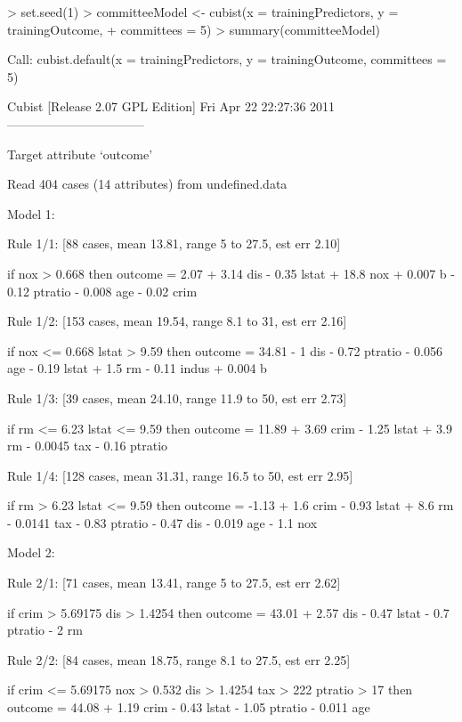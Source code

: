 \documentclass[12pt]{article}
\renewenvironment{Schunk}{\vspace{\topsep}}{\vspace{\topsep}}
\begin{document}
\begin{Schunk}
\begin{Sinput}
> set.seed(1)
> committeeModel <- cubist(x = trainingPredictors, y = trainingOutcome,
+                          committees = 5)
> summary(committeeModel)
\end{Sinput}
\begin{Soutput}
Call:
cubist.default(x = trainingPredictors, y = trainingOutcome, committees = 5)


Cubist [Release 2.07 GPL Edition]  Fri Apr 22 22:27:36 2011
---------------------------------

    Target attribute `outcome'

Read 404 cases (14 attributes) from undefined.data

Model 1:

  Rule 1/1: [88 cases, mean 13.81, range 5 to 27.5, est err 2.10]

    if
	nox > 0.668
    then
	outcome = 2.07 + 3.14 dis - 0.35 lstat + 18.8 nox + 0.007 b
	          - 0.12 ptratio - 0.008 age - 0.02 crim

  Rule 1/2: [153 cases, mean 19.54, range 8.1 to 31, est err 2.16]

    if
	nox <= 0.668
	lstat > 9.59
    then
	outcome = 34.81 - 1 dis - 0.72 ptratio - 0.056 age - 0.19 lstat + 1.5 rm
	          - 0.11 indus + 0.004 b

  Rule 1/3: [39 cases, mean 24.10, range 11.9 to 50, est err 2.73]

    if
	rm <= 6.23
	lstat <= 9.59
    then
	outcome = 11.89 + 3.69 crim - 1.25 lstat + 3.9 rm - 0.0045 tax
	          - 0.16 ptratio

  Rule 1/4: [128 cases, mean 31.31, range 16.5 to 50, est err 2.95]

    if
	rm > 6.23
	lstat <= 9.59
    then
	outcome = -1.13 + 1.6 crim - 0.93 lstat + 8.6 rm - 0.0141 tax
	          - 0.83 ptratio - 0.47 dis - 0.019 age - 1.1 nox

Model 2:

  Rule 2/1: [71 cases, mean 13.41, range 5 to 27.5, est err 2.62]

    if
	crim > 5.69175
	dis > 1.4254
    then
	outcome = 43.01 + 2.57 dis - 0.47 lstat - 0.7 ptratio - 2 rm

  Rule 2/2: [84 cases, mean 18.75, range 8.1 to 27.5, est err 2.25]

    if
	crim <= 5.69175
	nox > 0.532
	dis > 1.4254
	tax > 222
	ptratio > 17
    then
	outcome = 44.08 + 1.19 crim - 0.43 lstat - 1.05 ptratio - 0.011 age


\end{Soutput}
\end{Schunk}
\end{document}
